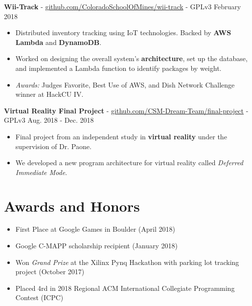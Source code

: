 \documentclass[10pt,letterpaper]{article}
\begin{document}
\textbf{Wii-Track} -
\href{https://github.com/ColoradoSchoolOfMines/wii-track}{github.com/ColoradoSchoolOfMines/wii-track}
- GPLv3 \hfill February 2018
\begin{itemize}
    \item Distributed inventory tracking using IoT technologies. Backed by
        \textbf{AWS Lambda} and \textbf{DynamoDB}.
    \item Worked on designing the overall system's \textbf{architecture}, set up
        the database, and implemented a Lambda function to identify packages by
        weight.
    \item \textit{Awards:} Judges Favorite, Best Use of AWS, and Dish Network
        Challenge winner at HackCU IV.
\end{itemize}

\textbf{Virtual Reality Final Project} -
\href{https://github.com/CSM-Dream-Team/final-project}{github.com/CSM-Dream-Team/final-project}
- GPLv3 \hfill Aug. 2018 - Dec. 2018
\begin{itemize}
    \item Final project from an independent study in \textbf{virtual reality}
        under the supervision of Dr. Paone.
    \item We developed a new program architecture for virtual reality called
        \textit{Deferred Immediate Mode}.
\end{itemize}

\section*{Awards and Honors}
\begin{itemize}
    \item First Place at Google Games in Boulder (April 2018)
    \item Google C-MAPP scholarship recipient (January 2018)
    \item Won \textit{Grand Prize} at the Xilinx Pynq Hackathon with parking lot
        tracking project (October 2017)
    \item Placed 4rd in 2018 Regional ACM International Collegiate Programming
        Contest (ICPC)
\end{itemize}
\end{document}
